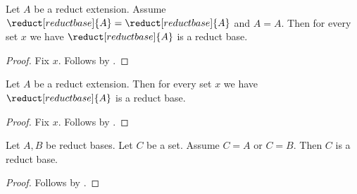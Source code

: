 \begin{proposition}\label{reduct_local_projection}
    Let $A$ be a reduct extension.
    Assume $\reduct[reduct base]{A}=\reduct[reduct base]{A}$ and $A=A$.
    Then for every set $x$ we have $\reduct[reduct base]{A}$ is a reduct base.
\end{proposition}
\begin{proof}
    Fix $x$.
    Follows by .
\end{proof}

\begin{proposition}\label{reduct_local_missing}
    Let $A$ be a reduct extension.
    Then for every set $x$ we have $\reduct[reduct base]{A}$ is a reduct base.
\end{proposition}
\begin{proof}
    Fix $x$.
    Follows by .
\end{proof}

\begin{proposition}\label{reduct_predicate_substitution}
    Let $A,B$ be reduct bases.
    Let $C$ be a set.
    Assume $C=A$ or $C=B$.
    Then $C$ is a reduct base.
\end{proposition}
\begin{proof}
    Follows by .
\end{proof}

